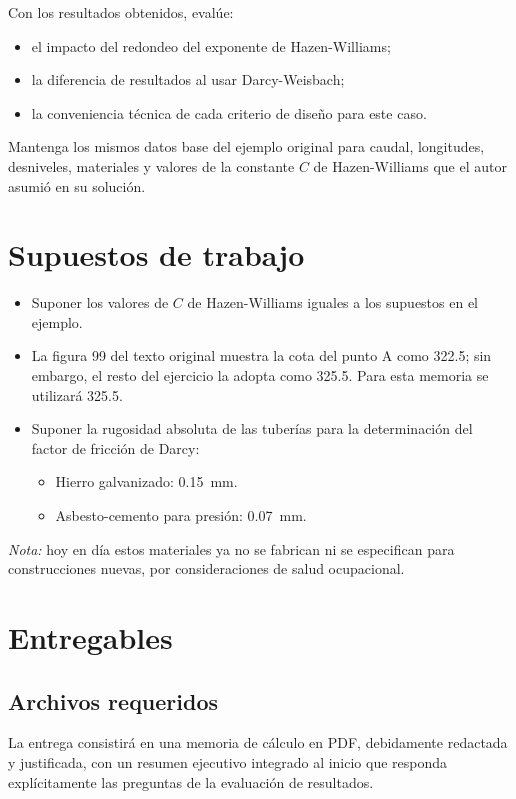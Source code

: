\documentclass[12pt]{article}
\begin{document}
Con los resultados obtenidos, evalúe:
\begin{itemize}
\item el impacto del redondeo del exponente de Hazen-Williams;
\item la diferencia de resultados al usar Darcy-Weisbach;
\item la conveniencia técnica de cada criterio de diseño para este caso.
\end{itemize}

Mantenga los mismos datos base del ejemplo original para caudal, longitudes, desniveles, materiales y valores de la constante $C$ de Hazen-Williams que el autor asumió en su solución.

\section{Supuestos de trabajo}
\begin{itemize}
\item Suponer los valores de $C$ de Hazen-Williams iguales a los supuestos en el ejemplo.
\item La figura 99 del texto original muestra la cota del punto A como \num{322.5}; sin embargo, el resto del ejercicio la adopta como \num{325.5}. Para esta memoria se utilizará \num{325.5}.
\item Suponer la rugosidad absoluta de las tuberías para la determinación del factor de fricción de Darcy:
\begin{itemize}
\item Hierro galvanizado: \SI{0.15}{\milli\meter}.
\item Asbesto-cemento para presión: \SI{0.07}{\milli\meter}.
\end{itemize}
\end{itemize}

\textit{Nota:} hoy en día estos materiales ya no se fabrican ni se especifican para construcciones nuevas, por consideraciones de salud ocupacional.

\section{Entregables}
\subsection{Archivos requeridos}
La entrega consistirá en una memoria de cálculo en PDF, debidamente redactada y justificada, con un resumen ejecutivo integrado al inicio que responda explícitamente las preguntas de la evaluación de resultados.
\end{document}
